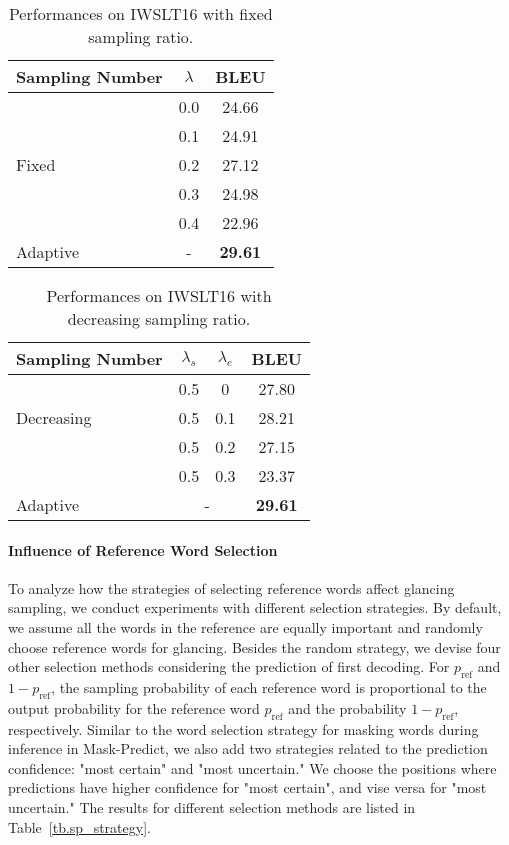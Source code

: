 \begin{table}[!tbp]
\centering
\small
\begin{tabular}{lcc}
\toprule
Sampling Number &  $\lambda$  & BLEU \\
\midrule
\multirow{5}{*}{Fixed}  & 0.0  & 24.66  \\
                        & 0.1  & 24.91 \\
                        & 0.2  & 27.12  \\
                        & 0.3  & 24.98  \\
                        & 0.4  & 22.96  \\
\midrule
Adaptive                & -  & \textbf{29.61}  \\
\bottomrule
\end{tabular}
\caption{Performances on IWSLT16 with fixed sampling ratio.}
\label{tb.constant_base}
\end{table}


\begin{table}[!tbp]
\small
\centering
\begin{tabular}{lccc}
\toprule
Sampling Number& $\lambda_s$ & $\lambda_e$ & BLEU \\
\midrule
\multirow{3}{*}{Decreasing} & 0.5 & 0 & 27.80  \\
& 0.5 & 0.1 & 28.21  \\
& 0.5 & 0.2 & 27.15 \\
& 0.5 & 0.3 & 23.37 \\
\midrule
Adaptive & \multicolumn{2}{c}{-} & \textbf{29.61}  \\
\bottomrule
\end{tabular}
\caption{\label{tb.adaptive_base} Performances on IWSLT16 with decreasing sampling ratio.}
\end{table}
\paragraph{Influence of Reference Word Selection}
To analyze how the strategies of selecting reference words affect glancing sampling, we conduct experiments with different selection strategies. By default, we assume all the words in the reference are equally important and randomly choose reference words for glancing.
Besides the random strategy, we devise four other selection methods considering the prediction of first decoding. 
For $p_\text{ref}$ and $1-p_\text{ref}$, the sampling probability of each reference word is proportional to the output probability for the reference word $p_\text{ref}$ and the probability $1-p_\text{ref}$, respectively. Similar to the word selection strategy for masking words during inference in Mask-Predict, we also add two strategies related to the prediction confidence: "most certain" and "most uncertain." We choose the positions where predictions have higher confidence for "most certain", and vise versa for "most uncertain." The results for different selection methods are listed in Table~\ref{tb.sp_strategy}.

